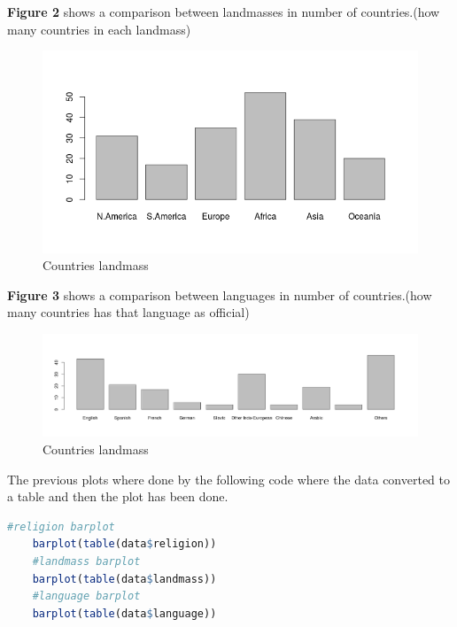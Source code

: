 \documentclass{article}
\begin{document}
	\textbf{Figure 2} shows a comparison between landmasses in number of countries.(how many countries in each landmass)
	\begin{figure}[H]
		\begin{center}
			\includegraphics[scale=0.7]{barplotlandmass.png} %
		\end{center}
		\caption{Countries landmass} %
	\end{figure}
	\textbf{Figure 3} shows a comparison between languages in number of countries.(how many countries has that language as official)
	\begin{figure}[H]
		\begin{center}
			\includegraphics[scale=0.3]{barplotlanguages.png} %
		\end{center}
		\caption{Countries landmass} %
	\end{figure}
	The previous plots where done by the following code where the data converted to a table and then the plot has been done.
	\begin{lstlisting}[language=R]
	#religion barplot 
	barplot(table(data$religion))
	#landmass barplot
	barplot(table(data$landmass))
	#language barplot
	barplot(table(data$language))
	\end{lstlisting}
	
\end{document}
